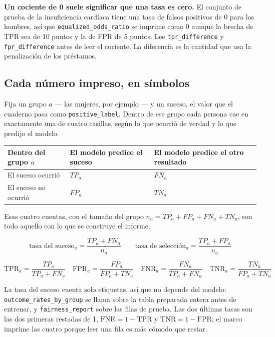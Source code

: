 \documentclass[11pt]{article}
\newcommand{\fn}[1]{\texttt{\small #1}}
\begin{document}
\begin{careful}
\textbf{Un cociente de 0 suele significar que una tasa es cero.} El conjunto de prueba de la insuficiencia cardíaca tiene una tasa de falsos positivos de 0 para los hombres, así que \fn{equalized\_odds\_ratio} se imprime como 0 aunque la brecha de TPR sea de 10 puntos y la de FPR de 5 puntos. Lee \fn{tpr\_difference} y \fn{fpr\_difference} antes de leer el cociente. La diferencia es la cantidad que usa la penalización de los préstamos.
\end{careful}

\subsection{Cada número impreso, en símbolos}
\label{sec:formulas}

Fija un grupo \(a\) --- las mujeres, por ejemplo --- y un suceso, el valor que el cuaderno pasa como \fn{positive\_label}. Dentro de ese grupo cada persona cae en exactamente una de cuatro casillas, según lo que ocurrió de verdad y lo que predijo el modelo.

\begin{table}[H]
\centering
\small
\begin{tabularx}{\textwidth}{@{}l Y Y@{}}
\toprule
Dentro del grupo \(a\) & El modelo predice el suceso & El modelo predice el otro resultado \\
\midrule
El suceso ocurrió & \(TP_a\) & \(FN_a\) \\
El suceso no ocurrió & \(FP_a\) & \(TN_a\) \\
\bottomrule
\end{tabularx}
\end{table}

\noindent
Esas cuatro cuentas, con el tamaño del grupo \(n_a = TP_a + FP_a + FN_a + TN_a\), son todo aquello con lo que se construye el informe.

\[
\text{tasa del suceso}_a = \frac{TP_a + FN_a}{n_a}
\qquad
\text{tasa de selección}_a = \frac{TP_a + FP_a}{n_a}
\]

\[
\mathrm{TPR}_a = \frac{TP_a}{TP_a + FN_a}
\quad
\mathrm{FPR}_a = \frac{FP_a}{FP_a + TN_a}
\quad
\mathrm{FNR}_a = \frac{FN_a}{TP_a + FN_a}
\quad
\mathrm{TNR}_a = \frac{TN_a}{FP_a + TN_a}
\]

La tasa del suceso cuenta solo etiquetas, así que no depende del modelo: \fn{outcome\_rates\_by\_group} se llama sobre la tabla preparada entera antes de entrenar, y \fn{fairness\_report} sobre las filas de prueba. Las dos últimas tasas son las dos primeras restadas de 1, \(\mathrm{FNR} = 1 - \mathrm{TPR}\) y \(\mathrm{TNR} = 1 - \mathrm{FPR}\); el marco imprime las cuatro porque leer una fila es más cómodo que restar.
\end{document}
